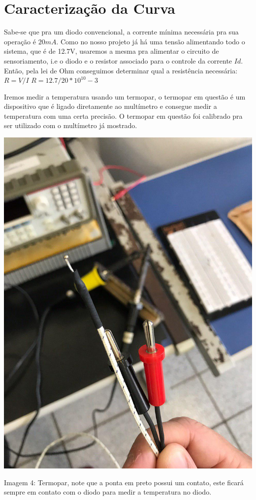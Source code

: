 \documentclass{article}
\begin{document}
\section{Caracterização da Curva}
Sabe-se que pra um diodo convencional, a corrente mínima necessária pra sua operação é $20mA$. Como no nosso projeto já há uma tensão alimentando todo o sistema, que é de 12.7V, usaremos a mesma pra alimentar o circuito de sensoriamento, i.e o diodo e o resistor associado para o controle da corrente $Id$. Então, pela lei de Ohm conseguimos determinar qual a resistência necessária: $R=V/I$ $R=12.7/20*10^10-3$

Iremos medir a temperatura usando um termopar, o termopar em questão é um dispositivo que é ligado diretamente ao multímetro e consegue medir a temperatura com uma certa precisão. O termopar em questão foi calibrado pra ser utilizado com o multímetro já mostrado.

\begin{center}
    \includegraphics[scale=0.2]{images/termopar.jpg}
    
    Imagem 4: Termopar, note que a ponta em preto possui um contato, este ficará sempre em contato com o diodo para medir a temperatura no diodo.
\end{center}
\end{document}
